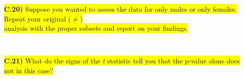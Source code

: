 \documentclass{article}
\newif\ifPrintSolution
\newcommand{\sol}[1]{\ifPrintSolution {\color{blue} #1 } \fi}
\begin{document}
\colorbox{yellow}{\textbf{C.20)} Suppose you wanted to assess the data for only males or only females. Repeat your original ($\ne$) } \\ \colorbox{yellow}{analysis with the proper subsets and report on your findings.}

\sol{MALES: $t = \frac{512 - 480}{\frac{33.9}{\sqrt{234}}}$ = 14.4397, p-value $\approx$ 0}\\
\sol{FEMALES: $t = \frac{386 - 480}{\frac{58.9}{\sqrt{59}}}$ = -12.25853, p-value $\approx$ 0}

\vspace{0.5in}

\colorbox{yellow}{\textbf{C.21)} What do the signs of the \textit{t} statistic tell you that the p-value alone does not in this case?}

\sol{Here, it tells us two things. One, the evidence is strong that the male mean is larger than the null hypothesis (positive \textit{t}) while the evidence is strong that the female mean is smaller than the null hypothesis (negative \textit{t}). Furthermore, despite both p-values being computationally 0, we can see that the distance of the male scores is farther away, in terms of standard deviations, than the female scores.}
\end{document}
